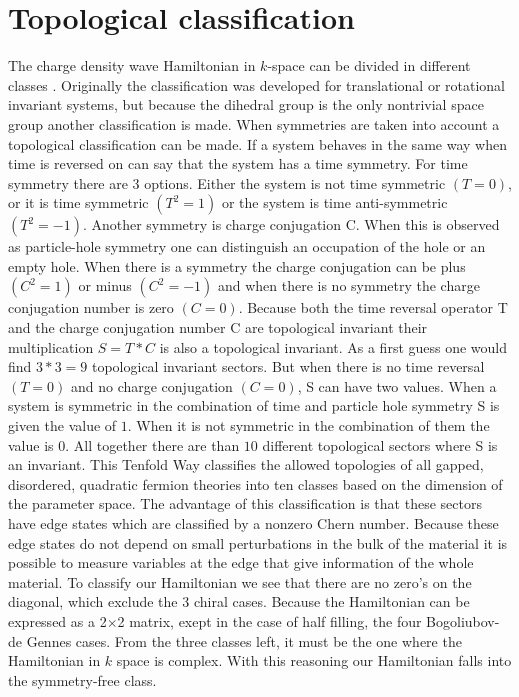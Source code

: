 \documentclass[letterpaper, 10 pt, conference]{ieeeconf}  %
\begin{document}
\section{Topological classification}

The charge density wave Hamiltonian in $k$-space can be divided in different
classes \cite{ryu2010}. Originally the classification was developed for translational or
rotational invariant systems, but because the dihedral group is the only
nontrivial space group another classification is made. When symmetries are taken
into account a topological classification can be made. If a system behaves in
the same way when time is reversed on can say that the system has a time
symmetry. For time symmetry there are 3 options. Either the system is not time
symmetric $(T=0)$, or it is time symmetric $(T^2=1)$ or the system is time
anti-symmetric  $(T^2=-1)$.  Another symmetry  is charge conjugation C. When
this is observed as particle-hole symmetry one can distinguish an occupation of
the hole or an empty hole. When there is a symmetry the  charge conjugation can
be plus $(C^2=1)$ or minus $(C^2=-1)$ and when there is no symmetry  the charge
conjugation number  is zero $(C=0)$.  Because both the time reversal operator T
and the charge conjugation number C are topological invariant their
multiplication $S=T * C $ is also a topological invariant. As a first guess one
would find $3 * 3 = 9 $ topological invariant sectors. But when there is no time
reversal $(T=0)$ and no charge conjugation $(C=0)$, S can have two values. When
a system is symmetric in the combination of time and particle hole symmetry S is
given the value of $1$. When it is not symmetric in the combination of them the
value is $0$. All together there are than $10$ different topological sectors
where S is an invariant. This Tenfold Way classifies the allowed topologies of
all gapped, disordered, quadratic fermion theories into ten classes based on the
dimension of the parameter space. The advantage of this classification is that
these sectors have edge states which are classified by a nonzero Chern number.
Because these edge states do not
depend on small perturbations in the bulk of the material it is possible to
measure variables at the edge that give information of the whole material.
To classify our Hamiltonian we see that there are no zero's on the diagonal,
which exclude the 3 chiral cases. Because the Hamiltonian can be expressed as a 2$\times$2
 matrix, exept in the case of half filling, the four Bogoliubov-de Gennes cases. From the three
 classes left, it must be the one where the Hamiltonian in $k$ space is complex.
 With this reasoning our Hamiltonian falls into the symmetry-free class.
\end{document}
